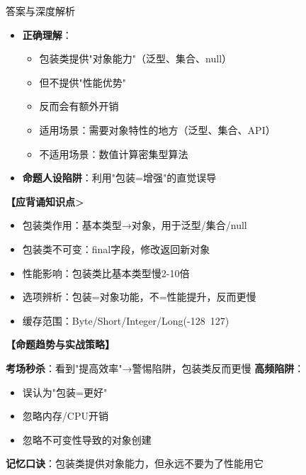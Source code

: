 \documentclass[12pt, a4paper]{ctexart}
\begin{document}
\begin{enumerate}[label=\textbf{\arabic*.}]
\begin{bluebox}{答案与深度解析}
\begin{itemize}[leftmargin=*, nosep, label={}]
\begin{itemize}[label={}, leftmargin=*, nosep]
\begin{lstlisting}[language=Java]
// 字节码原因：
// 1. 每次i++调用Integer.valueOf()
// 2. 每次i.intValue()拆箱
// 3. 频繁的对象创建和GC压力
				            \end{lstlisting}
				            \item \textbf{正确理解}：
				                  \begin{itemize}[label={}, nosep]
					                  \item 包装类提供"对象能力"（泛型、集合、null）
					                  \item 但不提供"性能优势"
					                  \item 反而会有额外开销
					                  \item 适用场景：需要对象特性的地方（泛型、集合、API）
					                  \item 不适用场景：数值计算密集型算法
				                  \end{itemize}
				            \item \textbf{命题人设陷阱}：利用"包装=增强"的直觉误导
			            \end{itemize}
		      \end{itemize}

		      \textbf{【应背诵知识点>}
		      \begin{itemize}[label={}, nosep]
			      \item 包装类作用：基本类型→对象，用于泛型/集合/null
			      \item 包装类不可变：final字段，修改返回新对象
			      \item 性能影响：包装类比基本类型慢2-10倍
			      \item 选项辨析：包装=对象功能，不=性能提升，反而更慢
			      \item 缓存范围：Byte/Short/Integer/Long(-128~127)
		      \end{itemize}

		      \textbf{【命题趋势与实战策略】}

		      \textbf{考场秒杀}：看到"提高效率"→警惕陷阱，包装类反而更慢
		      \textbf{高频陷阱}：
		      \begin{itemize}[label={}, nosep]
			      \item 误认为"包装=更好"
			      \item 忽略内存/CPU开销
			      \item 忽略不可变性导致的对象创建
		      \end{itemize}
		      \textbf{记忆口诀}：包装类提供对象能力，但永远不要为了性能用它
	      \end{bluebox}


\end{enumerate}
\end{document}
